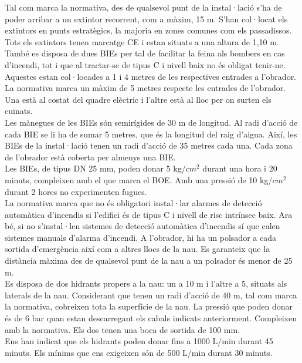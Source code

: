 \newline Tal com marca la normativa, des de qualsevol punt de la instal·lació s'ha de poder arribar a un extintor recorrent, com a màxim, 15 m. S'han col·locat els extintors en punts estratègics, la majoria en zones comunes com els passadissos. Tots els extintors tenen marcatge CE i estan situats a una altura de 1,10 m. \\
\newline També es disposa de dues BIEs per tal de facilitar la feina als bombers en cas d'incendi, tot i que al tractar-se de tipus C i nivell baix no és obligat tenir-ne. Aquestes estan col·locades a 1 i 4 metres de les respectives entrades a l'obrador. La normativa marca un màxim de 5 metres respecte les entrades de l'obrador. Una està al costat del quadre elèctric i l'altre està al lloc per on surten els cuinats.\\
\newline Les mànegues de les BIEs són semirígides de 30 m de longitud. Al radi d'acció de cada BIE se li ha de sumar 5 metres, que és la longitud del raig d'aigua. Així, les BIEs de la instal·lació tenen un radi d'acció de 35 metres cada una. Cada zona de l'obrador està coberta per almenys una BIE.\\
\newline Les BIEs, de tipus DN 25 mm, poden donar 5 kg/$cm^2$ durant una hora i 20 minuts, compleixen amb el que marca el BOE. Amb una pressió de 10 kg/$cm^2$ durant 2 hores no experimenten fugues.\\
\newline La normativa marca que no és obligatori instal·lar alarmes de detecció automàtica d'incendis si l'edifici és de tipus C i nivell de risc intrínsec baix. Ara bé, si no s'instal·len sistemes de detecció automàtica d'incendis sí que calen sistemes manuals d'alarma d'incendi. A l'obrador, hi ha un polsador a cada sortida d'emergència així com a altres llocs de la nau. Es garanteix que la distància màxima des de qualsevol punt de la nau a un polsador és menor de 25 m.\\
\newline Es disposa de dos hidrants propers a la nau: un a 10 m i l'altre a 5, situats als laterals de la nau. Considerant que tenen un radi d'acció de 40 m, tal com marca la normativa, cobreixen tota la superfície de la nau. La pressió que poden donar és de 6 bar quan estan descarregant els cabals indicats anteriorment. Compleixen amb la normativa. Els dos tenen una boca de sortida de 100 mm.\\
\newline Ens han indicat que els hidrants poden donar fins a 1000 L/min durant 45 minuts. Els mínims que ens exigeixen són de 500 L/min durant 30 minuts.

